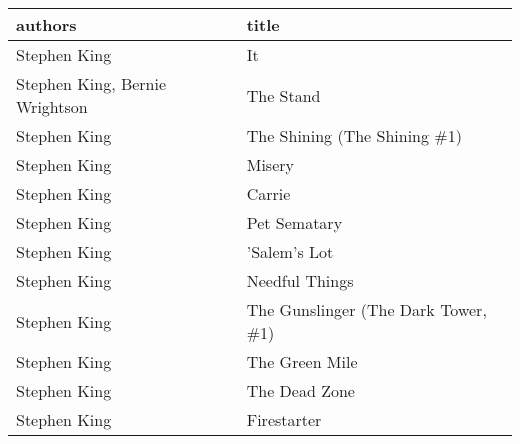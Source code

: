 \begin{tabular}{ll}
\toprule
                        authors &                                title \\
\midrule
                   Stephen King &                                   It \\
 Stephen King, Bernie Wrightson &                            The Stand \\
                   Stephen King &         The Shining (The Shining \#1) \\
                   Stephen King &                               Misery \\
                   Stephen King &                               Carrie \\
                   Stephen King &                         Pet Sematary \\
                   Stephen King &                         'Salem's Lot \\
                   Stephen King &                       Needful Things \\
                   Stephen King &  The Gunslinger (The Dark Tower, \#1) \\
                   Stephen King &                       The Green Mile \\
                   Stephen King &                        The Dead Zone \\
                   Stephen King &                          Firestarter \\
\bottomrule
\end{tabular}
